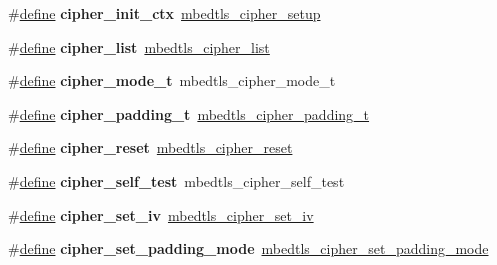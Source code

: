\begin{DoxyCompactItemize}
\#\hyperlink{structdefine}{define} {\bfseries cipher\+\_\+init\+\_\+ctx}~\hyperlink{cipher_8h_a009056b59d69abba5843ce78cd9aae1c}{mbedtls\+\_\+cipher\+\_\+setup}
\item 
\mbox{\label{compat-1_83_8h_af5815e9f4473026ffdd406c41157d275}} 
\#\hyperlink{structdefine}{define} {\bfseries cipher\+\_\+list}~\hyperlink{cipher_8h_a763ea39a9ccfc20f914fd3391d12a7fc}{mbedtls\+\_\+cipher\+\_\+list}
\item 
\mbox{\label{compat-1_83_8h_ad201970d4a274c39040af59987768c44}} 
\#\hyperlink{structdefine}{define} {\bfseries cipher\+\_\+mode\+\_\+t}~mbedtls\+\_\+cipher\+\_\+mode\+\_\+t
\item 
\mbox{\label{compat-1_83_8h_ad872910b03cb362f730b4c489d655799}} 
\#\hyperlink{structdefine}{define} {\bfseries cipher\+\_\+padding\+\_\+t}~\hyperlink{cipher_8h_a5b57bc07ab7c430e9b4f29f3a5729837}{mbedtls\+\_\+cipher\+\_\+padding\+\_\+t}
\item 
\mbox{\label{compat-1_83_8h_af796037a538548c7562a988dae2fe7e1}} 
\#\hyperlink{structdefine}{define} {\bfseries cipher\+\_\+reset}~\hyperlink{cipher_8h_a22b60318022c1947d9893721bc911335}{mbedtls\+\_\+cipher\+\_\+reset}
\item 
\mbox{\label{compat-1_83_8h_ae215456b4fe771365752326e57cda21c}} 
\#\hyperlink{structdefine}{define} {\bfseries cipher\+\_\+self\+\_\+test}~mbedtls\+\_\+cipher\+\_\+self\+\_\+test
\item 
\mbox{\label{compat-1_83_8h_a47bc21f801f5910673719b47de8bfafd}} 
\#\hyperlink{structdefine}{define} {\bfseries cipher\+\_\+set\+\_\+iv}~\hyperlink{cipher_8h_a570ef5913117fbb2592f75d0d834b51c}{mbedtls\+\_\+cipher\+\_\+set\+\_\+iv}
\item 
\mbox{\label{compat-1_83_8h_afbe158b83176eafb0ef2111467e4af07}} 
\#\hyperlink{structdefine}{define} {\bfseries cipher\+\_\+set\+\_\+padding\+\_\+mode}~\hyperlink{cipher_8h_afad97d1964a7a98d82488fecd052130f}{mbedtls\+\_\+cipher\+\_\+set\+\_\+padding\+\_\+mode}
\item 
\mbox{\label{compat-1_83_8h_a1ba5c9f98d32ca2e519c6231f3c3b6ea}} 

\end{DoxyCompactItemize}
